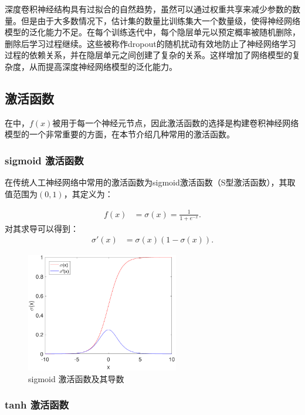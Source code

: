 深度卷积神经结构具有过拟合的自然趋势，虽然可以通过权重共享来减少参数的数量。但是由于大多数情况下，估计集的数量比训练集大一个数量级，使得神经网络模型的泛化能力不足。在每个训练迭代中，每个隐层单元以预定概率被随机删除，删除后学习过程继续。这些被称作dropout的随机扰动有效地防止了神经网络学习过程的依赖关系，并在隐层单元之间创建了复杂的关系。这样增加了网络模型的复杂度，从而提高深度神经网络模型的泛化能力。


\subsection{激活函数}

在中，$f(x)$被用于每一个神经元节点，因此激活函数的选择是构建卷积神经网络模型的一个非常重要的方面，在本节介绍几种常用的激活函数。

\subsubsection{sigmoid 激活函数}

在传统人工神经网络中常用的激活函数为sigmoid激活函数（S型激活函数），其取值范围为$(0,1)$，其定义为：

\begin{align}
f(x)&=\sigma(x)=\frac{1}{1+e^{-x}}.
\end{align}
对其求导可以得到：
\begin{align}
\sigma'(x)&=\sigma(x)\left(1-\sigma(x)\right).
\end{align}

\begin{figure}[hbt]
	\centering
	\includegraphics[width=6.67cm]{figures/networks/sigmoid}
	\caption{sigmoid 激活函数及其导数}
	\label{fig:sigmoid}
\end{figure}

\subsubsection{ tanh 激活函数}

